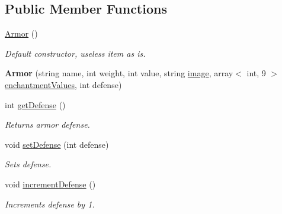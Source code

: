 \subsection*{Public Member Functions}
\begin{DoxyCompactItemize}
\item 
\hypertarget{class_armor_a23323e95bbeb488eb6fe54cbd83d49a2}{}\label{class_armor_a23323e95bbeb488eb6fe54cbd83d49a2} 
\hyperlink{class_armor_a23323e95bbeb488eb6fe54cbd83d49a2}{Armor} ()
\begin{DoxyCompactList}\small\item\em Default constructor, useless item as is. \end{DoxyCompactList}\item 
\hypertarget{class_armor_a8f822e9ef6cda3ef8625967682580f11}{}\label{class_armor_a8f822e9ef6cda3ef8625967682580f11} 
{\bfseries Armor} (string name, int weight, int value, string \hyperlink{class_item_add84a42b692ee5d580a92ae4a922f784}{image}, array$<$ int, 9 $>$ \hyperlink{class_item_a8532d8729f9433f41b7fc18b20d83236}{enchantment\+Values}, int defense)
\item 
\hypertarget{class_armor_a9ac9bec755b04172edeb6762db1012d6}{}\label{class_armor_a9ac9bec755b04172edeb6762db1012d6} 
int \hyperlink{class_armor_a9ac9bec755b04172edeb6762db1012d6}{get\+Defense} ()
\begin{DoxyCompactList}\small\item\em Returns armor defense. \end{DoxyCompactList}\item 
\hypertarget{class_armor_a4d5cc8d20c5fff714925a061ee8ba349}{}\label{class_armor_a4d5cc8d20c5fff714925a061ee8ba349} 
void \hyperlink{class_armor_a4d5cc8d20c5fff714925a061ee8ba349}{set\+Defense} (int defense)
\begin{DoxyCompactList}\small\item\em Sets defense. \end{DoxyCompactList}\item 
\hypertarget{class_armor_a2acffb5e791465d3c6bef5bfa86e8926}{}\label{class_armor_a2acffb5e791465d3c6bef5bfa86e8926} 
void \hyperlink{class_armor_a2acffb5e791465d3c6bef5bfa86e8926}{increment\+Defense} ()
\begin{DoxyCompactList}\small\item\em Increments defense by 1. \end{DoxyCompactList}\item 
\hypertarget{class_armor_a18ec027984c729af8580c79b050d57b8}{}\label{class_armor_a18ec027984c729af8580c79b050d57b8} 

\end{DoxyCompactItemize}
